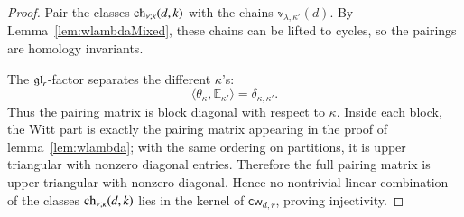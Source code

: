 \documentclass[main.tex]{subfiles}
\begin{document}
\begin{proof}
Pair the classes $\operatorname{ch}_{\nu;\kappa}(d,k)$ with the chains
$\mathbb{v}_{\lambda,\kappa'}(d)$.  By Lemma~\ref{lem:wlambdaMixed}, these chains can be lifted to cycles, so the pairings are homology invariants.

The $\mathfrak{gl}_r$-factor separates the different $\kappa$'s:
\[
  \big\langle \theta_\kappa,\mathbb{E}_{\kappa'}\big\rangle
  =
  \delta_{\kappa,\kappa'}.
\]
Thus the pairing matrix is block diagonal with respect to $\kappa$.  Inside each block, the Witt part is exactly the
pairing matrix appearing in the proof of lemma~\ref{lem:wlambda}; with the same ordering on partitions, it is upper triangular with nonzero diagonal entries.  Therefore the full pairing matrix is upper triangular with nonzero diagonal.  Hence no nontrivial linear combination of the classes
$\operatorname{ch}_{\nu;\kappa}(d,k)$ lies in the kernel of $\mathsf{cw}_{d,r}$, proving injectivity.
\end{proof}
\end{document}
